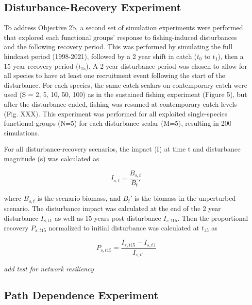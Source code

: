 \documentclass[
]{article}
\begin{document}
\subsection{Disturbance-Recovery Experiment}\label{disturbance-recovery-experiment}

To address Objective 2b, a second set of simulation experiments were performed that explored each functional groups' response to fishing-induced disturbances and the following recovery period. This was performed by simulating the full hindcast period (1998-2021), followed by a 2 year shift in catch (\(t_0\) to \(t_1\)), then a 15 year recovery period (\(t_15\)). A 2 year disturbance period was chosen to allow for all species to have at least one recruitment event following the start of the disturbance. For each species, the same catch scalars on contemporary catch were used (S = 2, 5, 10, 50, 100) as in the sustained fishing experiment (Figure 5), but after the disturbance ended, fishing was resumed at contemporary catch levels (Fig. XXX). This experiment was performed for all exploited single-species functional groups (N=5) for each disturbance scalar (M=5), resulting in 200 simulations.

For all disturbance-recovery scenarios, the impact (I) at time t and disturbance magnitude (s) was calculated as

\begin{equation}
  I_{s,t} = \frac{B_{s,t}}{B_{t}'}
  \label{eq:impact}
\end{equation}

where \(B_{s,t}\) is the scenario biomass, and \(B_{t}'\) is the biomass in the unperturbed scenario. The disturbance impact was calculated at the end of the 2 year disturbance \(I_{s,t1}\) as well as 15 years post-disturbance \(I_{s,t15}\). Then the proportional recovery \(P_{s,t15}\) normalized to initial disturbance was calculated at \(t_{15}\) as

\begin{equation}
  P_{s,t15} = \frac{I_{s,t15} - I_{s,t1}}{I_{s,t1}}
  \label{eq:recovery-prop}
\end{equation}

\emph{add test for network resiliency}

\subsection{Path Dependence Experiment}\label{path-dependence-experiment}
\end{document}
